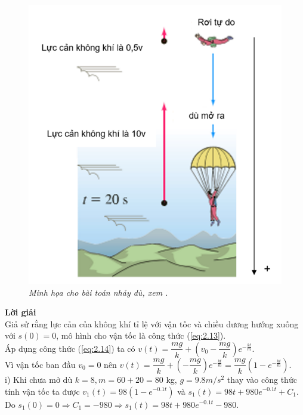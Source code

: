 \begin{figure}[H]
	\centering
	\includegraphics[scale=0.7]{Images/hinh_2_22.png}
	\caption[Minh họa cho bài toán nhảy dù, xem \cite{ref4}.
	]{\itshape\fontsize{13pt}{0pt}\selectfont\centering Minh họa cho bài toán nhảy dù, xem \cite{ref4}.}
	\label{hinh2.22}
\end{figure} 
\noindent\textbf{Lời giải}\\
Giả sử rằng lực cản của không khí tỉ lệ với vận tốc và chiều dương hướng xuống với $s(0) = 0$, mô hình cho vận tốc là công thức (\ref{eq:2.13}).\\
Áp dụng công thức (\ref{eq:2.14}) ta có $v(t)=\dfrac{mg}{k}+({{v}_{0}}-\dfrac{mg}{k}){{e}^{-\frac{kt}{m}}}$.\\
Vì vận tốc ban đầu ${{v}_{0}}=0$ nên $v(t)=\dfrac{mg}{k}+(-\dfrac{mg}{k}){{e}^{-\frac{kt}{m}}}=\dfrac{mg}{k}(1-{{e}^{-\frac{kt}{m}}})$.\\
i) Khi chưa mở dù  $k=8, m=60+20=80$ kg, $g=9.8m/{{s}^{2}}$ thay vào công thức tính vận 
tốc ta được ${{v}_{1}}(t)=98(1-{{e}^{-0.1t}})$ và ${{s}_{1}}(t)=98t+980{{e}^{-0.1t}}+{{C}_{1}}$. \\
Do ${{s}_{1}}(0)=0\Rightarrow {{C}_{1}}=-980\Rightarrow {{s}_{1}}(t)=98t+980{{e}^{-0.1t}}-980$. \\
